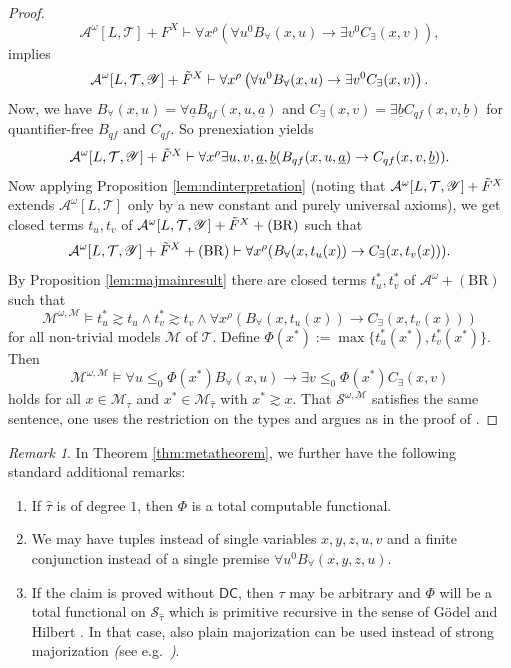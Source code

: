 \documentclass[11pt]{amsart}
\theoremstyle{definition}
\theoremstyle{remark}
\newtheorem{remark}[theorem]{Remark}
\newcommand{\DC}{\textsf{DC}}
\begin{document}
\begin{proof}
\[
\mathcal{A}^\omega[L,\mathcal{T}]+F^X\vdash\forall x^\rho\left(\forall u^0 B_\forall(x,u)\rightarrow\exists v^0 C_\exists(x,v)\right),
\]
implies 
\[
\mathcal{A}^\omega[L,\mathcal{T},\mathscr{Y}]+\Tilde{F}^X\vdash\forall x^\rho\left(\forall u^0 B_\forall(x,u)\rightarrow\exists v^0 C_\exists(x,v)\right).
\]
Now, we have $B_\forall(x,u)=\forall\underline{a} B_{qf}(x,u,\underline{a})$ and $C_\exists(x,v)=\exists\underline{b} C_{qf}(x,v,\underline{b})$ for quantifier-free $B_{qf}$ and $C_{qf}$. So prenexiation yields
\[
\mathcal{A}^\omega[L,\mathcal{T},\mathscr{Y}]+\Tilde{F}^X\vdash\forall x^\rho\exists u,v,\underline{a},\underline{b}(B_{qf}(x,u,\underline{a})\rightarrow C_{qf}(x,v,\underline{b})).
\]
Now applying Proposition \ref{lem:ndinterpretation} (noting that $\mathcal{A}^\omega[L,\mathcal{T},\mathscr{Y}]+\Tilde{F}^X$ extends $\mathcal{A}^\omega[L,\mathcal{T}]$ only by a new constant and purely universal axioms), we get closed terms $t_u,t_v$ of $\mathcal{A}^\omega[L,\mathcal{T},\mathscr{Y}]+\Tilde{F}^X+(\mathrm{BR})$ such that
\[
\mathcal{A}^\omega[L,\mathcal{T},\mathscr{Y}]+\Tilde{F}^X+(\mathrm{BR})\vdash\forall x^\rho(B_\forall (x,t_u(x))\rightarrow C_\exists(x,t_v(x))).
\]
By Proposition \ref{lem:majmainresult} there are closed terms $t^*_u,t^*_v$ of $\mathcal{A}^\omega+(\mathrm{BR})$ such that
\[
\mathcal{M}^{\omega,\mathscr{M}}\models t^*_u\gtrsim t_u\land t^*_v\gtrsim t_v\land\forall x^\rho(B_\forall(x,t_u(x))\rightarrow C_\exists(x,t_v(x)))
\]
for all non-trivial models $\mathscr{M}$ of $\mathcal{T}$. Define $\Phi(x^*):=\max\{t^*_u(x^*),t^*_v(x^*)\}$. Then
\[
\mathcal{M}^{\omega,\mathscr{M}}\models\forall u\leq_0\Phi(x^*) B_\forall(x,u)\rightarrow\exists v\leq_0\Phi(x^*) C_\exists(x,v)
\]
holds for all $x\in \mathcal{M}_\tau$ and $x^*\in \mathcal{M}_{\widehat{\tau}}$ with $x^*\gtrsim x$. That $\mathcal{S}^{\omega,\mathscr{M}}$ satisfies the same sentence, one uses the restriction on the types and argues as in the proof of \cite[Theorem 17.52]{Kohlenbach2008}.
\end{proof}
\begin{remark}
    In Theorem \ref{thm:metatheorem}, we further have the following standard additional remarks:
    \begin{enumerate}
\item If $\widehat{\tau}$ is of degree $1$, then $\Phi$ is a total computable functional. 
\item We may have tuples instead of single variables $x,y,z,u,v$ and a finite conjunction instead of a single premise $\forall u^0 B_\forall(x,y,z,u)$.
\item If the claim is proved without $\DC$, then $\tau$ may be arbitrary and $\Phi$ will be a total functional on $ \mathcal{S}_{\widehat{\tau}}$ which is primitive recursive in the sense of G\"odel \cite{Goe1958} and Hilbert \cite{Hil1926}. In that case, also plain majorization can be used instead of strong majorization \emph{(}see e.g.\ \cite{Kohlenbach2008}\emph{)}.
\end{enumerate}
\end{remark}
\end{document}
